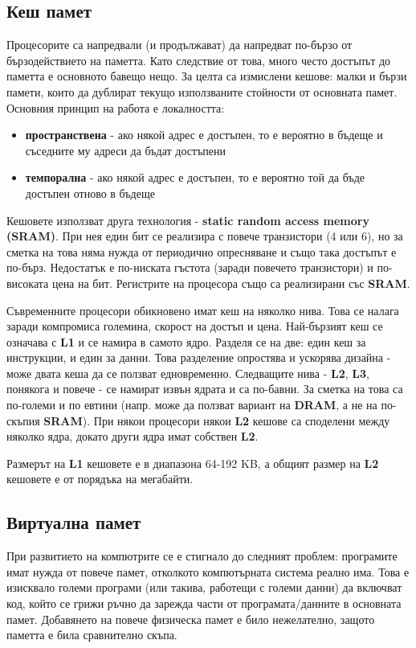 \documentclass[fleqn,12pt]{article}
\begin{document}
\subsection{Кеш памет}
Процесорите са напредвали (и продължават) да напредват по-бързо от бързодействието на паметта. Като следствие от това, много често
достъпът до паметта е основното бавещо нещо. За целта са измислени кешове: малки и бързи памети, които да дублират текущо използваните 
стойности от основната памет. Основния принцип на работа е локалността:
\begin{itemize}
    \item \textbf{пространствена} - ако някой адрес е достъпен, то е вероятно в бъдеще и съседните му адреси да бъдат достъпени
    \item \textbf{темпорална} - ако някой адрес е достъпен, то е вероятно той да бъде достъпен отново в бъдеще
\end{itemize}

Кешовете използват друга технология - \textbf{static random access memory (SRAM)}. При нея един бит се реализира с повече транзистори (4 или 6),
но за сметка на това няма нужда от периодично опресняване и също така достъпът е по-бърз. Недостатък е по-ниската гъстота (заради повечето транзистори)
и по-високата цена на бит. Регистрите на процесора също са реализирани със \textbf{SRAM}.

Съвременните процесори обикновено имат кеш на няколко нива. Това се налага заради компромиса големина, скорост на достъп и цена.
Най-бързият кеш се означава с \textbf{L1} и се намира в самото ядро. Разделя се на две: един кеш за инструкции, и един за данни.
Това разделение опростява и ускорява дизайна - може двата кеша да се ползват едновременно.
Следващите нива - \textbf{L2}, \textbf{L3}, понякога и повече - се намират извън ядрата и са по-бавни. 
За сметка на това са по-големи и по евтини (напр. може да ползват вариант на \textbf{DRAM}, а не на по-скъпия \textbf{SRAM}). 
При някои процесори някои \textbf{L2} кешове са споделени между няколко ядра, докато други ядра имат собствен \textbf{L2}.

Размерът на \textbf{L1} кешовете е в диапазона 64-192 KB, а общият размер на \textbf{L2} кешовете е от порядъка на мегабайти.

\subsection{Виртуална памет}
При развитието на компютрите се е стигнало до следният проблем: програмите имат нужда от повече памет, отколкото компютърната система реално има.
Това е изисквало големи програми (или такива, работещи с големи данни) да включват код, който се грижи ръчно да зарежда части от програмата/данните
в основната памет. Добавянето на повече физическа памет е било нежелателно, защото паметта е била сравнително скъпа.
\end{document}
